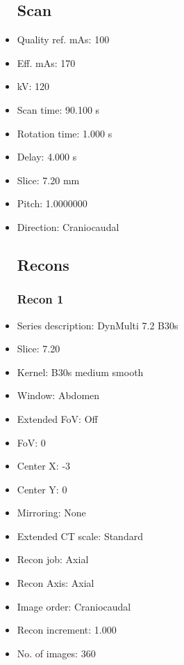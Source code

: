 \documentclass[12pt]{article}
\begin{document}
\begin{itemize}
\subsection{Scan}
\item Quality ref. mAs: 100\item Eff. mAs: 170\item kV: 120\item Scan time: 90.100 s\item Rotation time: 1.000 s\item Delay: 4.000 s\item Slice: 7.20 mm\item Pitch: 1.0000000\item Direction: Craniocaudal\subsection{Recons}

\subsubsection{Recon 1}
\item Series description: DynMulti 7.2 B30s
\item Slice: 7.20
\item Kernel: B30s medium smooth
\item Window: Abdomen
\item Extended FoV: Off
\item FoV: 0
\item Center X: -3
\item Center Y: 0
\item Mirroring: None
\item Extended CT scale: Standard
\item Recon job: Axial
\item Recon Axis: Axial
\item Image order: Craniocaudal
\item Recon increment: 1.000
\item No. of images: 360
\end{itemize}
\end{document}
